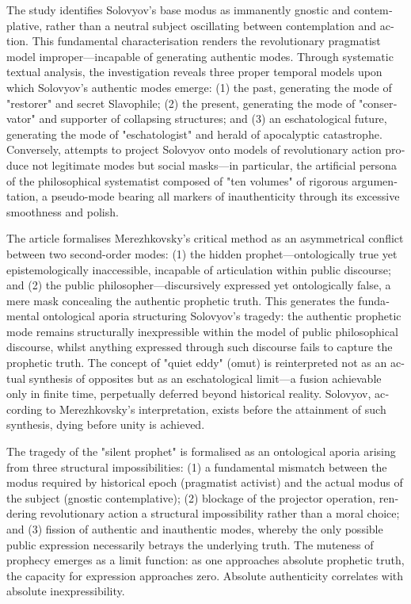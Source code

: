 \begin{english}
    The study identifies Solovyov's base modus as immanently gnostic and contemplative, rather than a neutral subject oscillating between contemplation and action. This fundamental characterisation renders the revolutionary pragmatist model improper—incapable of generating authentic modes. Through systematic textual analysis, the investigation reveals three proper temporal models upon which Solovyov's authentic modes emerge: (1) the past, generating the mode of "restorer" and secret Slavophile; (2) the present, generating the mode of "conservator" and supporter of collapsing structures; and (3) an eschatological future, generating the mode of "eschatologist" and herald of apocalyptic catastrophe. Conversely, attempts to project Solovyov onto models of revolutionary action produce not legitimate modes but social masks—in particular, the artificial persona of the philosophical systematist composed of "ten volumes" of rigorous argumentation, a pseudo-mode bearing all markers of inauthenticity through its excessive smoothness and polish.

    The article formalises Merezhkovsky's critical method as an asymmetrical conflict between two second-order modes: (1) the hidden prophet—ontologically true yet epistemologically inaccessible, incapable of articulation within public discourse; and (2) the public philosopher—discursively expressed yet ontologically false, a mere mask concealing the authentic prophetic truth. This generates the fundamental ontological aporia structuring Solovyov's tragedy: the authentic prophetic mode remains structurally inexpressible within the model of public philosophical discourse, whilst anything expressed through such discourse fails to capture the prophetic truth. The concept of "quiet eddy" (omut) is reinterpreted not as an actual synthesis of opposites but as an eschatological limit—a fusion achievable only in finite time, perpetually deferred beyond historical reality. Solovyov, according to Merezhkovsky's interpretation, exists before the attainment of such synthesis, dying before unity is achieved.

    The tragedy of the "silent prophet" is formalised as an ontological aporia arising from three structural impossibilities: (1) a fundamental mismatch between the modus required by historical epoch (pragmatist activist) and the actual modus of the subject (gnostic contemplative); (2) blockage of the projector operation, rendering revolutionary action a structural impossibility rather than a moral choice; and (3) fission of authentic and inauthentic modes, whereby the only possible public expression necessarily betrays the underlying truth. The muteness of prophecy emerges as a limit function: as one approaches absolute prophetic truth, the capacity for expression approaches zero. Absolute authenticity correlates with absolute inexpressibility.


\end{english}
